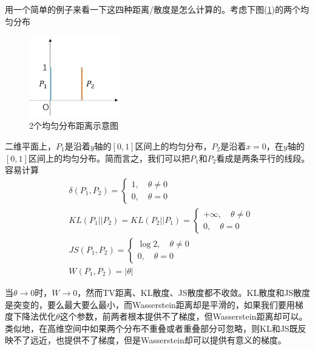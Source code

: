             用一个简单的例子来看一下这四种距离/散度是怎么计算的。考虑下图(\ref{fig:2个均匀分布距离示意图})的两个均匀分布
                \begin{figure}[H]
                \centering
                \includegraphics[width=4cm]{images/Two_uniform_distribution_distances.jpg}
                \caption{2个均匀分布距离示意图}
                \label{fig:2个均匀分布距离示意图}
                \end{figure}
            二维平面上，$P_1$是沿着$y$轴的$[0,1]$区间上的均匀分布，$P_2$是沿着$x=0$，在$y$轴的$[0,1]$区间上的均匀分布。简而言之，我们可以把$P_1$和$P_2$看成是两条平行的线段。容易计算
            \begin{align*}
            &\delta(P_1,P_2) =
            \left\{
            \begin{aligned}
            1, \quad \theta \neq 0\\
            0,\quad \theta = 0
            \end{aligned}
            \right.\\
            &KL(P_1||P_2) = KL(P_2||P_1) =
            \left\{
            \begin{aligned}
            +\infty ,\quad \theta \neq 0\\
            0,\quad \theta = 0
            \end{aligned}
            \right.\\
            &JS(P_1,P_2) =
            \left\{
            \begin{aligned}
            \log 2,\quad \theta \neq 0\\
            0,\quad \theta =0
            \end{aligned}
            \right.\\
            &W(P_1,P_2) = |\theta|
            \end{align*}
            \par
            当$\theta \to 0$时，$W\to 0$，然而TV距离、KL散度、JS散度都不收敛。KL散度和JS散度是突变的，要么最大要么最小，而Wasserstein距离却是平滑的，如果我们要用梯度下降法优化$\theta$这个参数，前两者根本提供不了梯度，但Wasserstein距离却可以。类似地，在高维空间中如果两个分布不重叠或者重叠部分可忽略，则KL和JS既反映不了远近，也提供不了梯度，但是Wasserstein却可以提供有意义的梯度。
